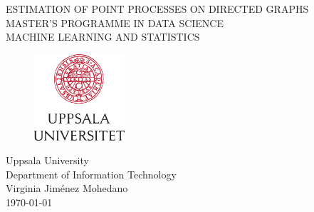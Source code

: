
\thispagestyle{empty}

\vspace*{+5em}
\begin{center}
\LARGE ESTIMATION OF POINT PROCESSES ON DIRECTED GRAPHS\\
\vspace*{+5em}
\large MASTER'S PROGRAMME IN DATA SCIENCE\\
\large MACHINE LEARNING AND STATISTICS\\
\vspace*{+3em}
\begin{figure}[H]
\centering
\includegraphics[width=0.3\textwidth]{Images/logo_uu_se.png}
\end{figure}

\vspace*{+3em}
Uppsala University\\
Department of Information Technology\\
\vspace*{+2em}
Virginia Jim\'enez Mohedano\\

\vspace*{+8em}
\today

\end{center}
